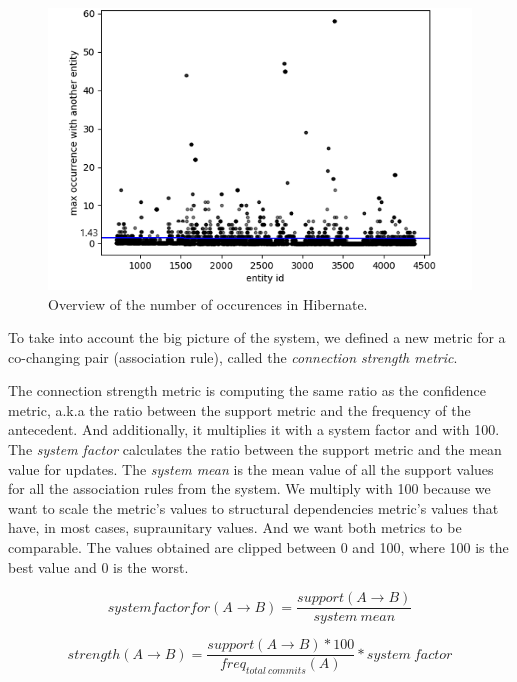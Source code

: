 \documentclass[runningheads]{comsis2}
\begin{document}
\begin{figure}
\centering
\includegraphics[scale=0.6]{fig_hibernate_maxOcc.png}
\caption{Overview of the number of occurences in Hibernate. }
\label{fig:strength_overview_hibernate}
\centering
\end{figure}

To take into account the big picture of the system, we defined a new metric for a co-changing pair (association rule), called the \textit{connection strength metric}. 

The connection strength metric is computing the same ratio as the confidence metric, a.k.a the ratio between the support metric and the frequency of the antecedent. And additionally, it multiplies it with a system factor and with 100. 
The \textit{system factor} calculates the ratio between the support metric and the mean value for updates. The \textit{system mean} is the mean value of all the support values for all the association rules from the system. 
We multiply with 100 because we want to scale the metric's values to structural dependencies metric's values that have, in most cases, supraunitary values. And we want both metrics to be comparable. The values obtained are clipped between 0 and 100, where 100 is the best value and 0 is the worst.

\begin{equation}
 system factor for (A \rightarrow B) =\frac{support (A \rightarrow B) }{system\ mean}
\end{equation}

\begin{equation}
 strength (A \rightarrow B) =\frac{support (A \rightarrow B) * 100}{freq_{total\ commits}(A)} * system\ factor
\end{equation}
\end{document}
